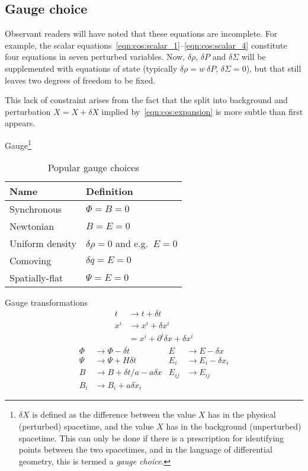 \subsection{Gauge choice}
Observant readers will have noted that these equations are incomplete. For example, the scalar equations~\eqref{eqn:cos:scalar_1}--\eqref{eqn:cos:scalar_4} constitute four equations in seven perturbed variables. Now, $\delta\rho$, $\delta P$ and $\delta\Sigma$ will be supplemented with equations of state (typically $\delta\rho = w\:\delta P$, $\delta\Sigma=0$), but that still leaves two degrees of freedom to be fixed.

This lack of constraint arises from the fact that the split into background and perturbation $X=X+\delta X$ implied by~\eqref{eqn:cos:expansion} is more subtle than first appears. 

Gauge\footnote{$\delta X$ is defined as the difference between the value $X$ has in the physical (perturbed) spacetime, and the value $X$ has in the background (unperturbed) spacetime. This can only be done if there is a prescription for identifying points between the two spacetimes, and in the language of differential geometry, this is termed a {\em gauge choice}.}

\begin{table}
  \centering
\begin{tabular}{ll}
 \toprule
  Name & Definition \\
 \midrule
 \midrule
 Synchronous & $\Phi=B=0$ \\
 Newtonian & $B=E=0$ \\
 Uniform density & $\delta\rho=0$ and e.g.\ $E=0$ \\
 Comoving & $\delta q = E = 0$ \\
 Spatially-flat & $\Psi=E=0$ \\
 \bottomrule
\end{tabular}
\caption{Popular gauge choices}\label{tab:cos:gauge_choice}
\end{table}
Gauge transformations
\begin{align}
  t &\rightarrow t + \delta t  \\
  x^i &\rightarrow x^i  + \delta x^i \nonumber\\
  &=   x^i + \partial^i \delta x + \delta x^i
\end{align}
\begin{align}
  \Phi &\rightarrow \Phi - \delta \dot{t} &
  E &\rightarrow E - \delta x \nonumber \\
  \Psi &\rightarrow \Psi +H \delta t &
  E_i & \rightarrow E_i - \delta x_i\nonumber \\
  B &\rightarrow B + \delta t/a - a\delta \dot{x} &
  E_{ij} &\rightarrow E_{ij}\nonumber \\
  B_i &\rightarrow  B_i + a \delta\dot{x}_i &
\end{align}

